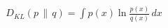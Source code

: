 \documentclass[preview]{standalone}
\begin{document}
\begin{align*}
D_{KL}(p\,\|\,q) = \int p(x)\ln\frac{p(x)}{q(x)}\,dx
\end{align*}
\end{document}
